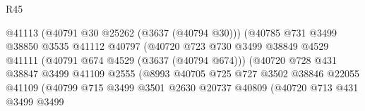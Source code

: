 \begin{lexlean}{R45}
\begin{coremodule}
                                              @41113
                                              (@40791 @30 @25262 (@3637 (@40794 @30)))
                                              (@40785
                                                @731
                                                @3499
                                                @38850
                                                @3535
                                                @41112
                                                @40797
                                                (@40720
                                                  @723
                                                  @730
                                                  @3499
                                                  @38849
                                                  @4529
                                                  @41111
                                                  (@40791 @674 @4529 (@3637 (@40794 @674)))
                                                  (@40720
                                                    @728
                                                    @431
                                                    @38847
                                                    @3499
                                                    @41109
                                                    @2555
                                                    (@8993
                                                      @40705
                                                      @725
                                                      @727
                                                      @3502
                                                      @38846
                                                      @22055
                                                      @41109
                                                      (@40799
                                                        @715
                                                        @3499
                                                        @3501
                                                        @2630
                                                        @20737
                                                        @40809
                                                        (@40720
                                                          @713
                                                          @431
                                                          @3499
                                                          @3499

\end{coremodule}
\end{lexlean}
